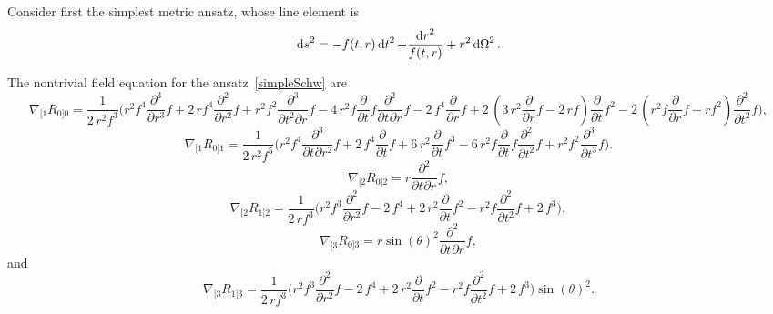 Consider first the simplest metric ansatz, whose line element is
\begin{equation}
  \mathop{\mathrm{d}s}\nolimits^2 = - f(t,r) \mathop{\mathrm{d}t}\nolimits^2 + \frac{ \mathop{\mathrm{d}r}\nolimits^2 }{ f(t,r) } + r^2 \mathop{\mathrm{d}\Omega}\nolimits^2.
  \label{simpleSchw}
\end{equation}
\begin{widetext}
  The nontrivial field equation for the ansatz~\eqref{simpleSchw} are
  \begin{dmath}
    \nabla_{[1} R_{0]0} = \frac{1}{2 \, r^{2} f^{3}} \Bigg( r^{2} f^{4} \frac{\partial^3}{\partial r^{3}}f + 2 \, r f^{4} \frac{\partial^2}{\partial r^{2}}f + r^{2} f^{2} \frac{\partial^3}{\partial t^{2}\partial r^{}}f - 4 \, r^{2} f \frac{\partial}{\partial t^{}}f \frac{\partial^2}{\partial t^{}\partial r^{}}f - 2 \, f^{4} \frac{\partial}{\partial r^{}}f + 2 \, {\left(3 \, r^{2} \frac{\partial}{\partial r^{}}f - 2 \, r f\right)} \frac{\partial}{\partial t^{}}f^{2} - 2 \, {\left(r^{2} f \frac{\partial}{\partial r^{}}f - r f^{2}\right)} \frac{\partial^2}{\partial t^{2}}f \Bigg) ,
    \label{e100}
  \end{dmath}
  \begin{dmath}
    \nabla_{[1} R_{0]1} = \frac{1}{2 \, r^{2} f^{5}} \Bigg( r^{2} f^{4} \frac{\partial^3}{\partial t^{}\partial r^{2}}f + 2 \, f^{4} \frac{\partial}{\partial t^{}}f + 6 \, r^{2} \frac{\partial}{\partial t^{}}f^{3} - 6 \, r^{2} f \frac{\partial}{\partial t^{}}f \frac{\partial^2}{\partial t^{2}}f + r^{2} f^{2} \frac{\partial^3}{\partial t^{3}}f \Bigg) .
    \label{e101}
  \end{dmath}
  \begin{dmath}
    \nabla_{[2} R_{0]2} = r \frac{\partial^2}{\partial t^{}\partial r^{}}f,
    \label{e202}
  \end{dmath}
  \begin{dmath}
    \nabla_{[2} R_{1]2} = \frac{1}{2 \, r f^{3}} \Bigg(r^{2} f^{3} \frac{\partial^2}{\partial r^{2}}f - 2 \, f^{4} + 2 \, r^{2} \frac{\partial}{\partial t^{}}f^{2} - r^{2} f \frac{\partial^2}{\partial t^{2}}f + 2 \, f^{3} \Bigg),
    \label{e212}
  \end{dmath}
  \begin{dmath}
    \nabla_{[3} R_{0]3} = r \sin\left({\theta}\right)^{2} \frac{\partial^2}{\partial t^{}\partial r^{}}f,
    \label{e303}
  \end{dmath}
  and
  \begin{dmath}
    \nabla_{[3} R_{1]3} = \frac{1}{2 \, r f^{3}} \Bigg(r^{2} f^{3} \frac{\partial^2}{\partial r^{2}}f - 2 \, f^{4} + 2 \, r^{2} \frac{\partial}{\partial t^{}}f^{2} - r^{2} f \frac{\partial^2}{\partial t^{2}}f + 2 \, f^{3}\Bigg) \sin\left({\theta}\right)^{2}.
    \label{e313}
  \end{dmath}
\end{widetext}
